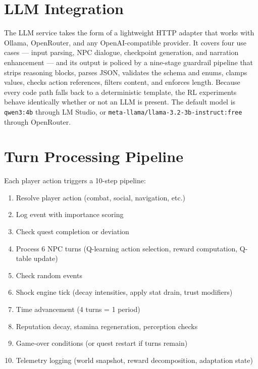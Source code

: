 \documentclass[12pt, a4paper, oneside]{report}
\begin{document}
\section{LLM Integration}
\label{sec:llm-integration}

The LLM service takes the form of a lightweight HTTP adapter that works with Ollama, OpenRouter, and any OpenAI-compatible provider. It covers four use cases --- input parsing, NPC dialogue, checkpoint generation, and narration enhancement --- and its output is policed by a nine-stage guardrail pipeline that strips reasoning blocks, parses JSON, validates the schema and enums, clamps values, checks action references, filters content, and enforces length. Because every code path falls back to a deterministic template, the RL experiments behave identically whether or not an LLM is present. The default model is \texttt{qwen3:4b} through LM Studio, or \texttt{meta-llama/llama-3.2-3b-instruct:free} through OpenRouter.

\section{Turn Processing Pipeline}
\label{sec:turn-pipeline}

Each player action triggers a 10-step pipeline:
\begin{enumerate}[nosep]
    \item Resolve player action (combat, social, navigation, etc.)
    \item Log event with importance scoring
    \item Check quest completion or deviation
    \item Process 6 NPC turns (Q-learning action selection, reward computation, Q-table update)
    \item Check random events
    \item Shock engine tick (decay intensities, apply stat drain, trust modifiers)
    \item Time advancement (4 turns = 1 period)
    \item Reputation decay, stamina regeneration, perception checks
    \item Game-over conditions (or quest restart if turns remain)
    \item Telemetry logging (world snapshot, reward decomposition, adaptation state)
\end{enumerate}

\end{document}
